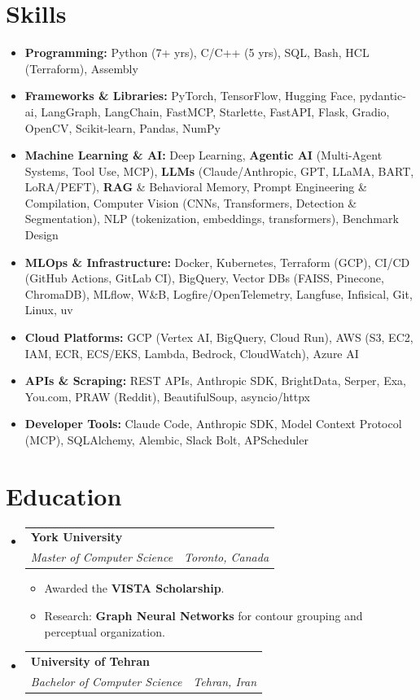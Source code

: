\documentclass[letterpaper,11pt]{article}
\makeatletter
\newcommand{\resumeItem}[1]{
  \item\small{#1 \vspace{-2pt}}
}
\newcommand{\resumeSubheading}[4]{
  \vspace{-2pt}\item
  \begin{tabular*}{1.0\textwidth}[t]{l@{\extracolsep{\fill}}r}
    \textbf{#1} & \textbf{\small #2} \\
    \textit{\small#3} & \textit{\small #4} \\
  \end{tabular*}\vspace{-7pt}
}
\newcommand{\resumeSubHeadingListStart}{\begin{itemize}[leftmargin=0.0in, label={}]}
\newcommand{\resumeSubHeadingListEnd}{\end{itemize}}
\newcommand{\resumeItemListStart}{\begin{itemize}[leftmargin=0.15in]}
\newcommand{\resumeItemListEnd}{\end{itemize}\vspace{-5pt}}
\makeatother
\begin{document}
\section{Skills}
\resumeSubHeadingListStart
  \item \textbf{Programming:} Python (7+ yrs), C/C++ (5 yrs), SQL, Bash, HCL (Terraform), Assembly
  \item \textbf{Frameworks \& Libraries:} PyTorch, TensorFlow, Hugging Face, pydantic-ai, LangGraph, LangChain, FastMCP, Starlette, FastAPI, Flask, Gradio, OpenCV, Scikit-learn, Pandas, NumPy
  \item \textbf{Machine Learning \& AI:} Deep Learning, \textbf{Agentic AI} (Multi-Agent Systems, Tool Use, MCP), \textbf{LLMs} (Claude/Anthropic, GPT, LLaMA, BART, LoRA/PEFT), \textbf{RAG} \& Behavioral Memory, Prompt Engineering \& Compilation, Computer Vision (CNNs, Transformers, Detection \& Segmentation), NLP (tokenization, embeddings, transformers), Benchmark Design
  \item \textbf{MLOps \& Infrastructure:} Docker, Kubernetes, Terraform (GCP), CI/CD (GitHub Actions, GitLab CI), BigQuery, Vector DBs (FAISS, Pinecone, ChromaDB), MLflow, W\&B, Logfire/OpenTelemetry, Langfuse, Infisical, Git, Linux, uv
  \item \textbf{Cloud Platforms:} GCP (Vertex AI, BigQuery, Cloud Run), AWS (S3, EC2, IAM, ECR, ECS/EKS, Lambda, Bedrock, CloudWatch), Azure AI
  \item \textbf{APIs \& Scraping:} REST APIs, Anthropic SDK, BrightData, Serper, Exa, You.com, PRAW (Reddit), BeautifulSoup, asyncio/httpx
  \item \textbf{Developer Tools:} Claude Code, Anthropic SDK, Model Context Protocol (MCP), SQLAlchemy, Alembic, Slack Bolt, APScheduler
\resumeSubHeadingListEnd


\section{Education}
\resumeSubHeadingListStart

\resumeSubheading
  {York University}{}
  {Master of Computer Science}{Toronto, Canada}
  \resumeItemListStart
    \resumeItem{Awarded the \textbf{VISTA Scholarship}.}
    \resumeItem{Research: \textbf{Graph Neural Networks} for contour grouping and perceptual organization.}
  \resumeItemListEnd

\resumeSubheading
  {University of Tehran}{}
  {Bachelor of Computer Science}{Tehran, Iran}

\resumeSubHeadingListEnd
\end{document}
